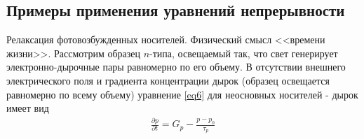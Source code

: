 





\subsection{Примеры применения уравнений непрерывности}

Релаксация фотовозбужденных носителей. Физический смысл <<времени жизни>>. Рассмотрим образец $n$-типа, освещаемый так, что свет генерирует электронно-дырочные пары равномерно по его объему. В отсутствии внешнего электрического поля и градиента концентрации дырок (образец освещается равномерно по всему объему) уравнение \eqref{eq6} для неосновных носителей - дырок имеет вид
\begin{gather}
	\label{eq9}
	\frac{\partial p}{\partial t}=G_{p}-\frac{p-p_{0}}{\tau_{p}}
\end{gather}

